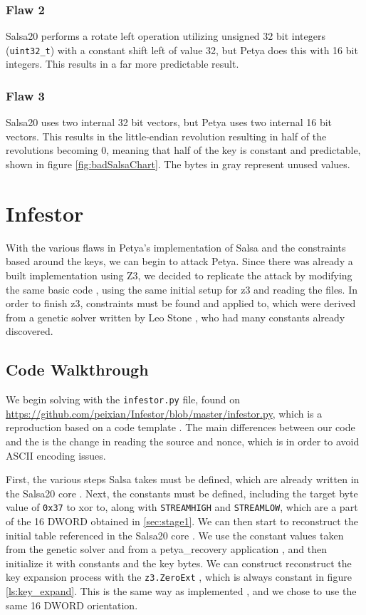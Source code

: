 \documentclass[twocolumn]{article}
\newcommand{\code}[1]{\texttt{#1}}
\begin{document}
\subsubsection{Flaw 2}
Salsa20 performs a rotate left operation utilizing unsigned 32 bit integers (\code{uint32\_t}) \cite{salsa20} with a constant shift left of value 32, but Petya does this with 16 bit integers. This results in a far more predictable result.

\subsubsection{Flaw 3}
Salsa20 uses two internal 32 bit vectors, but Petya uses two internal 16 bit vectors. This results in the little-endian revolution resulting in half of the revolutions becoming 0, meaning that half of the key is constant and predictable, shown in figure \ref{fig:badSalsaChart}. The bytes in gray represent unused values. 


\section{Infestor}
\label{sec:infestor}
With the various flaws in Petya's implementation of Salsa and the constraints based around the keys, we can begin to attack Petya. Since there was already a built implementation using Z3, we decided to replicate the attack by modifying the same basic code \cite{codeTemplate}, using the same initial setup for z3 and reading the files. In order to finish z3, constraints must be found and applied to, which were derived from a genetic solver written by Leo Stone \cite{geneticSolver}, who had many constants already discovered.

\subsection{Code Walkthrough}

We begin solving with the \code{infestor.py} file, found on \url{https://github.com/peixian/Infestor/blob/master/infestor.py}, which is a reproduction based on a code template \cite{codeTemplate}. The main differences between our code and the \cite{codeTemplate} is the change in reading the source and nonce, which is in order to avoid ASCII encoding issues. 

First, the various steps Salsa takes must be defined, which are already written in the Salsa20 core \cite{salsa20Core}. Next, the constants must be defined, including the target byte value of \code{0x37} to xor to, along with \code{STREAMHIGH} and \code{STREAMLOW}, which are a part of the 16 DWORD obtained in \ref{sec:stage1}. We can then start to reconstruct the initial table referenced in the Salsa20 core \cite{salsa20Core}. We use the constant values taken from the genetic solver \cite{geneticSolver} and from a petya\_recovery application \cite{petyaRecovery}, and then initialize it with constants and the key bytes. We can construct reconstruct the key expansion process with the \code{z3.ZeroExt} \cite{z3Guide}, which is always constant in figure \ref{ls:key_expand}. This is the same way as implemented \cite{codeTemplate}, and we chose to use the same 16 DWORD orientation. 
\end{document}

